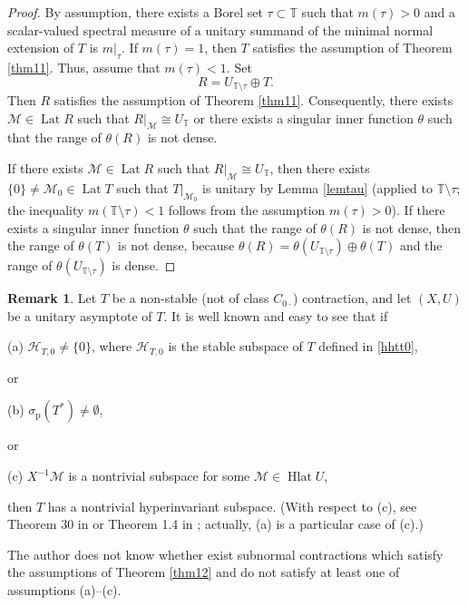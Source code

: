 \documentclass[a4paper,oneside,11pt]{amsart}
\numberwithin{equation}{section}
\theoremstyle{plain}
\theoremstyle{definition}
\newtheorem{remark}[theorem]{Remark}
\begin{document}
\begin{proof} By assumption, there exists  a Borel set $\tau\subset\mathbb T$  such that  $m(\tau)>0$ 
and a scalar-valued spectral measure of a unitary summand of the minimal normal extension of $T$ is $m|_{\tau}$. 
If  $m(\tau)=1$, then $T$ satisfies the assumption of Theorem \ref{thm11}. Thus, assume that $m(\tau)<1$.  
Set 
\begin{equation*}R=U_{\mathbb T\setminus\tau}\oplus T.
\end{equation*}
Then $R$ satisfies the assumption of Theorem \ref{thm11}. 
Consequently,  there exists $\mathcal M\in \operatorname{Lat}R$ such that  $R|_{\mathcal M}\cong U_{\mathbb T}$ or there exists 
a singular inner function $\theta$ such that the range of $\theta(R)$ is not dense.

If there exists $\mathcal M\in \operatorname{Lat}R$ such that  $R|_{\mathcal M}\cong U_{\mathbb T}$, 
then 
there exists $\{0\}\neq\mathcal M_0\in\operatorname{Lat}T$ such that  $T|_{\mathcal M_0}$ is unitary by Lemma \ref{lemtau} 
(applied to $\mathbb T\setminus\tau$; the inequality $m(\mathbb T\setminus\tau)<1$ follows from the assumption $m(\tau)>0$). 
If there exists 
a singular inner function $\theta$ such that the range of $\theta(R)$ is not dense, then the range of $\theta(T)$ is not dense, because  $\theta(R)=\theta(U_{\mathbb T\setminus\tau})\oplus \theta(T)$ and the range of 
$\theta(U_{\mathbb T\setminus\tau})$ is dense.
\end{proof}


\begin{remark} Let $T$ be a non-stable (not of class $C_{0\cdot}$) contraction, and let $(X, U)$ be a unitary asymptote of $T$. 
It is well known and easy to see that if 


\noindent (a) $\mathcal H_{T,0}\neq\{0\}$, where $\mathcal H_{T,0}$ is the stable subspace of $T$ defined in \eqref{hhtt0},

\noindent or

\noindent (b) $\sigma_{\mathrm{p}}(T^*)\neq\emptyset$,

\noindent or

\noindent (c) $X^{-1}\mathcal M$ is a nontrivial subspace for some $\mathcal M\in\operatorname{Hlat}U$,

\noindent then $T$ has a nontrivial hyperinvariant subspace. 
(With respect to (c), see Theorem 30 in \cite{k16} or Theorem 1.4 in \cite{g19}; actually, (a) is a particular case of (c).)

The author does not know whether exist subnormal contractions 
which satisfy the assumptions of Theorem \ref{thm12} and do not satisfy at  least one of assumptions (a)--(c). 
\end{remark}
\end{document}
